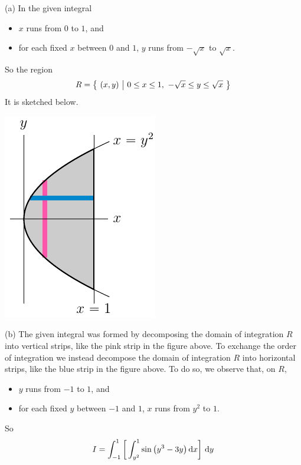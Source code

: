 \begin{solution}
(a) In the given integral
\begin{itemize}
\item
$x$ runs from $0$ to $1$, and
\item
for each fixed $x$ between $0$ and $1$,
$y$ runs from $-\sqrt{x}$ to $\sqrt{x}$.
\end{itemize}
So the region
\begin{equation*}
R=\big\{ \ (x,y)\ \big|\ 0\le x\le 1,\ -\sqrt{x}\le y\le \sqrt{x}\ \big\}
\end{equation*}
It is sketched below.
\begin{center}
     \includegraphics{fig/OE00DQ6.pdf}
\end{center}

(b) The given integral was formed by decomposing
the domain of integration $R$ into vertical strips, like the pink strip
in the figure above. To exchange the order of integration we instead
decompose the domain of integration $R$ into horizontal strips, 
like the blue strip in the figure above. To do so, we observe that, on $R$,
\begin{itemize}
\item 
$y$ runs from $-1$ to $1$, and
\item
for each fixed $y$ between $-1$ and $1$, $x$ runs from $y^2$ to $1$.
\end{itemize}
So 
\begin{equation*}
I=\int_{-1}^1\bigg[\int_{y^2}^1 \sin\big(y^3-3y\big)\,\mathrm{d}x\bigg]\ \mathrm{d}y
\end{equation*}


\end{solution}
